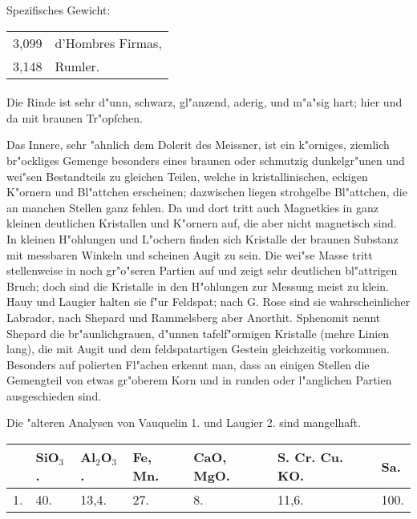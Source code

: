 \documentclass[a4paper, 11pt, oneside]{article}
\begin{document}
Spezifisches Gewicht:
\begin{table}[!ht]
    \centering
    \begin{tabular}{l l}
        3,099 & d'Hombres Firmas,\\
        3,148 & Rumler.
    \end{tabular}
\end{table}
\paragraph{}
Die Rinde ist sehr d"unn, schwarz, gl"anzend, aderig, und m"a"sig hart; hier und da mit braunen Tr"opfchen.

Das Innere, sehr "ahnlich dem Dolerit des Meissner, ist ein k"orniges, ziemlich br"ockliges Gemenge besonders eines braunen oder schmutzig dunkelgr"unen und wei"sen Bestandteils zu gleichen Teilen, welche in kristallinischen, eckigen K"ornern und Bl"attchen erscheinen; dazwischen liegen strohgelbe Bl"attchen, die an manchen Stellen ganz fehlen. Da und dort tritt auch Magnetkies in ganz kleinen deutlichen Kristallen und K"ornern auf, die aber nicht magnetisch sind. In kleinen H"ohlungen und L"ochern finden sich Kristalle der braunen Substanz mit messbaren Winkeln und scheinen Augit zu sein. Die wei"se Masse tritt stellenweise in noch gr"o"seren Partien auf und zeigt sehr deutlichen bl"attrigen Bruch; doch sind die Kristalle in den H"ohlungen zur Messung meist zu klein. Hauy und Laugier halten sie f"ur Feldspat; nach G. Rose sind sie wahrscheinlicher Labrador, nach Shepard und Rammelsberg aber Anorthit. Sphenomit nennt Shepard die br"aunlichgrauen, d"unnen tafelf"ormigen Kristalle (mehre Linien lang), die mit Augit und dem feldspatartigen Gestein gleichzeitig vorkommen. Besonders auf polierten Fl"achen erkennt man, dass an einigen Stellen die Gemengteil von etwas gr"oberem Korn und in runden oder l"anglichen Partien ausgeschieden sind.

Die "alteren Analysen von Vauquelin 1. und Laugier 2. sind mangelhaft.
\begin{table}[!ht]
    \centering
    \footnotesize
    \begin{tabular}{p{3mm} p{6mm} p{6mm} p{10mm} p{20mm} p{20mm} p{6mm}}
         & SiO$_{3}$. & Al$_{2}$O$_{3}$. & Fe, Mn. & CaO, MgO. & S. Cr. Cu. KO. & Sa. \\ \hline
        1. & 40. & 13,4. & 27. & 8. & 11,6. & 100. \\
    \end{tabular}
\end{table}
\end{document}

